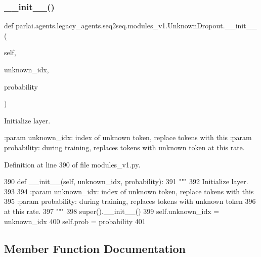 \subsubsection{\texorpdfstring{\+\_\+\+\_\+init\+\_\+\+\_\+()}{\_\_init\_\_()}}
{\footnotesize\ttfamily def parlai.\+agents.\+legacy\+\_\+agents.\+seq2seq.\+modules\+\_\+v1.\+Unknown\+Dropout.\+\_\+\+\_\+init\+\_\+\+\_\+ (\begin{DoxyParamCaption}\item[{}]{self,  }\item[{}]{unknown\+\_\+idx,  }\item[{}]{probability }\end{DoxyParamCaption})}

\begin{DoxyVerb}Initialize layer.

:param unknown_idx: index of unknown token, replace tokens with this
:param probability: during training, replaces tokens with unknown token
            at this rate.
\end{DoxyVerb}
 

Definition at line 390 of file modules\+\_\+v1.\+py.


\begin{DoxyCode}
390     \textcolor{keyword}{def }\_\_init\_\_(self, unknown\_idx, probability):
391         \textcolor{stringliteral}{"""}
392 \textcolor{stringliteral}{        Initialize layer.}
393 \textcolor{stringliteral}{}
394 \textcolor{stringliteral}{        :param unknown\_idx: index of unknown token, replace tokens with this}
395 \textcolor{stringliteral}{        :param probability: during training, replaces tokens with unknown token}
396 \textcolor{stringliteral}{                            at this rate.}
397 \textcolor{stringliteral}{        """}
398         super().\_\_init\_\_()
399         self.unknown\_idx = unknown\_idx
400         self.prob = probability
401 
\end{DoxyCode}


\subsection{Member Function Documentation}
\mbox{\label{classparlai_1_1agents_1_1legacy__agents_1_1seq2seq_1_1modules__v1_1_1UnknownDropout_a4527e73a4211e888db806e4526c0126e}} 

